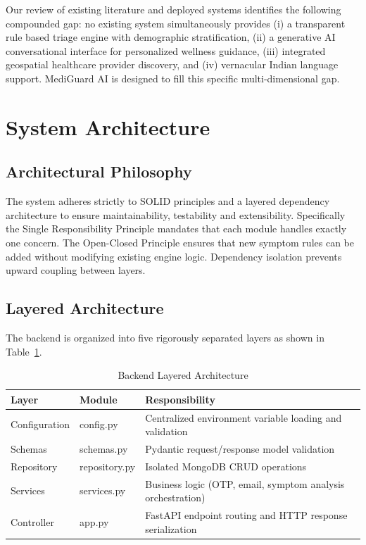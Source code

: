 \documentclass[conference]{IEEEtran}
\begin{document}
Our review of existing literature and deployed systems identifies the following compounded gap: no existing system simultaneously provides (i) a transparent rule based triage engine with demographic stratification, (ii) a generative AI conversational interface for personalized wellness guidance, (iii) integrated geospatial healthcare provider discovery, and (iv) vernacular Indian language support. MediGuard AI is designed to fill this specific multi-dimensional gap.

\section{System Architecture}

\subsection{Architectural Philosophy}

The system adheres strictly to SOLID principles and a layered dependency architecture to ensure maintainability, testability and extensibility. Specifically the Single Responsibility Principle mandates that each module handles exactly one concern. The Open-Closed Principle ensures that new symptom rules can be added without modifying existing engine logic. Dependency isolation prevents upward coupling between layers.

\subsection{Layered Architecture}

The backend is organized into five rigorously separated layers as shown in Table~\ref{tab:layers}.

\begin{table}[htbp]
\caption{Backend Layered Architecture}
\label{tab:layers}
\centering
\begin{tabular}{|p{1.6cm}|p{1.8cm}|p{3.6cm}|}
\hline
\textbf{Layer} & \textbf{Module} & \textbf{Responsibility} \\
\hline
Configuration & config.py & Centralized environment variable loading and validation \\
\hline
Schemas & schemas.py & Pydantic request/response model validation \\
\hline
Repository & repository.py & Isolated MongoDB CRUD operations \\
\hline
Services & services.py & Business logic (OTP, email, symptom analysis orchestration) \\
\hline
Controller & app.py & FastAPI endpoint routing and HTTP response serialization \\
\hline
\end{tabular}
\end{table}
\end{document}
